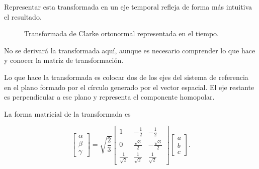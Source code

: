 Representar esta transformada en un eje temporal refleja de forma más intuitiva el resultado.
\begin{figure}[H]
	\centering
	\hspace*{-1.5cm}
	\caption{Transformada de Clarke ortonormal representada en el tiempo.}
\end{figure}



No se derivará la transformada aquí, aunque es necesario comprender lo que hace y conocer la matriz de transformación.

Lo que hace la transformada es colocar dos de los ejes del sistema de referencia en el plano formado por el círculo generado por el vector espacial. El eje restante es perpendicular a ese plano y representa el componente homopolar.

La forma matricial de la transformada es

\begin{equation}
    \begin{bmatrix}
        \alpha \\
        \beta \\
        \gamma
    \end{bmatrix}
    =
    \sqrt{\frac{2}{3}}
    \begin{bmatrix}
        1 & -\frac{1}{2} & -\frac{1}{2} \\
        0 & \frac{\sqrt{3}}{2} & -\frac{\sqrt{3}}{2} \\
        \frac{1}{\sqrt{2}} & \frac{1}{\sqrt{2}} & \frac{1}{\sqrt{2}}
    \end{bmatrix}
    \begin{bmatrix}
        a \\
        b \\
        c
    \end{bmatrix} \text{.}
\end{equation}

